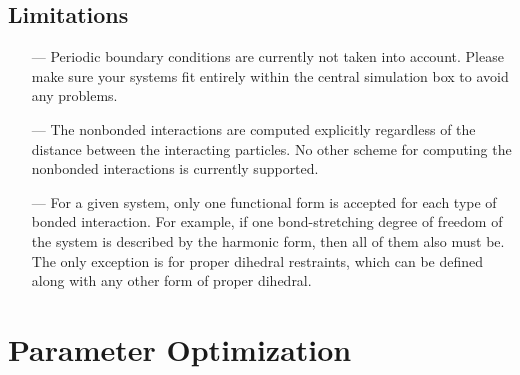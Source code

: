\documentclass[10pt,a4paper,openany]{memoir}
\numberwithin{equation}{section}
\begin{document}

\section{Limitations}
\label{sec:limitations}

\begin{itemize}
\item[---] Periodic boundary conditions are currently not taken into
  account. Please make sure your systems fit entirely within the
  central simulation box to avoid any problems.
\item[---] The nonbonded interactions are computed explicitly
  regardless of the distance between the interacting particles. No
  other scheme for computing the nonbonded interactions is currently
  supported.
\item[---] For a given system, only one functional form is accepted
  for each type of bonded interaction. For example, if one
  bond-stretching degree of freedom of the system is described by the
  harmonic form, then all of them also must be. The only exception is
  for proper dihedral restraints, which can be defined along with any
  other form of proper dihedral.
\end{itemize}

\chapter{Parameter Optimization}
\label{chap:ga}

%
%
%
\end{document}

